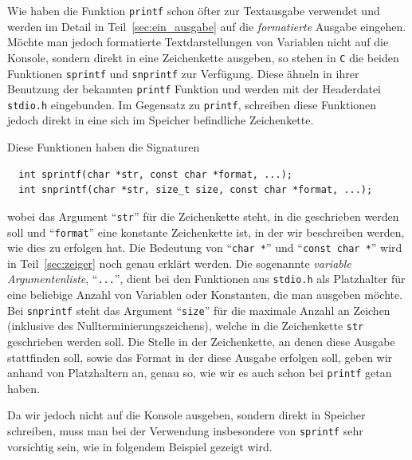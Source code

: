 Wie haben die Funktion \texttt{printf} schon öfter zur Textausgabe verwendet und werden im Detail in Teil~\ref{sec:ein_ausgabe} auf die \emph{formatierte} Ausgabe eingehen.
Möchte man jedoch formatierte Textdarstellungen von Variablen nicht auf die Konsole, sondern direkt in eine Zeichenkette ausgeben, so stehen in \texttt{C} die beiden Funktionen \texttt{sprintf} und \texttt{snprintf} zur Verfügung.
Diese ähneln in ihrer Benutzung der bekannten \texttt{printf} Funktion und werden mit der Headerdatei \texttt{stdio.h} eingebunden.
Im Gegensatz zu \texttt{printf}, schreiben diese Funktionen jedoch direkt in eine sich im Speicher befindliche Zeichenkette.

Diese Funktionen haben die Signaturen
\begin{lstlisting}
  int sprintf(char *str, const char *format, ...);
  int snprintf(char *str, size_t size, const char *format, ...);
\end{lstlisting}
wobei das Argument \enquote{\texttt{str}} für die Zeichenkette steht, in die geschrieben werden soll und \enquote{\texttt{format}} eine konstante Zeichenkette ist, in der wir beschreiben werden, wie dies zu erfolgen hat.
Die Bedeutung von \enquote{\texttt{char *}} und \enquote{\texttt{const char *}} wird in Teil~\ref{sec:zeiger} noch genau erklärt werden.
Die sogenannte \emph{variable Argumentenliste}, \enquote{\texttt{...}}, dient bei den Funktionen aus \texttt{stdio.h} als Platzhalter für eine beliebige Anzahl von Variablen oder Konstanten, die man ausgeben möchte.
Bei \texttt{snprintf} steht das Argument \enquote{\texttt{size}} für die maximale Anzahl an Zeichen (inklusive des Nullterminierungszeichens), welche in die Zeichenkette \texttt{str} geschrieben werden soll.
Die Stelle in der Zeichenkette, an denen diese Ausgabe stattfinden soll, sowie das Format in der diese Ausgabe erfolgen soll, geben wir anhand von Platzhaltern an, genau so, wie wir es auch schon bei \texttt{printf} getan haben.

Da wir jedoch nicht auf die Konsole ausgeben, sondern direkt in Speicher schreiben, muss man bei der Verwendung insbesondere von \texttt{sprintf} sehr vorsichtig sein, wie in folgendem Beispiel gezeigt wird.

